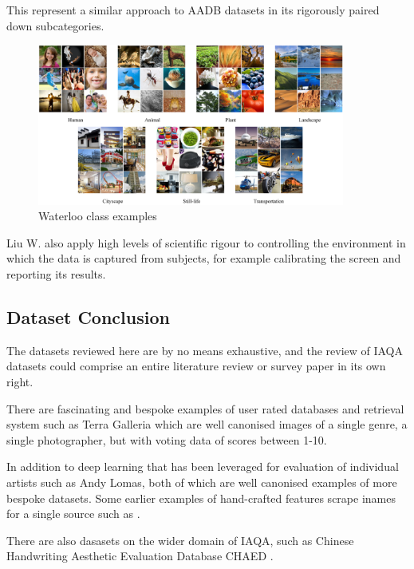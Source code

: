 This represent a similar approach to AADB datasets in its rigorously paired down subcategories.  

\begin{figure}[hp]
\centering
 \includegraphics[width=0.9\textwidth]{figures/database_ims/WATERloo.png}
  \caption{\label{fig:Pnet} Waterloo class examples}
  \label{fig:Pnet_}
\end{figure}

Liu W.\cite{Liu2017} also apply high levels of scientific rigour to controlling the environment in which the data is captured from subjects, for example calibrating the screen and reporting its results. 


\subsection{Dataset Conclusion}

The datasets reviewed here are by no means exhaustive, and the review of IAQA datasets could comprise an entire literature review or survey paper in its own right. 

There are fascinating and bespoke examples of user rated databases and retrieval system such as Terra Galleria\cite{Quand-T} which are well canonised\cite{Mayssara2014, Hutchison2013, Joshi2011} images of a single genre, a single photographer, but with voting data of scores between 1-10. 

In addition to deep learning that has been leveraged for evaluation of individual artists such as Andy Lomas\cite{McCormack2021}, both of which are well canonised examples of more bespoke datasets. Some earlier examples of hand-crafted features scrape inames for a single source such as \cite{Cheng2012}. 

There are also dasasets on the wider domain of IAQA, such as Chinese Handwriting Aesthetic Evaluation Database CHAED \cite{Sun2015}.  


